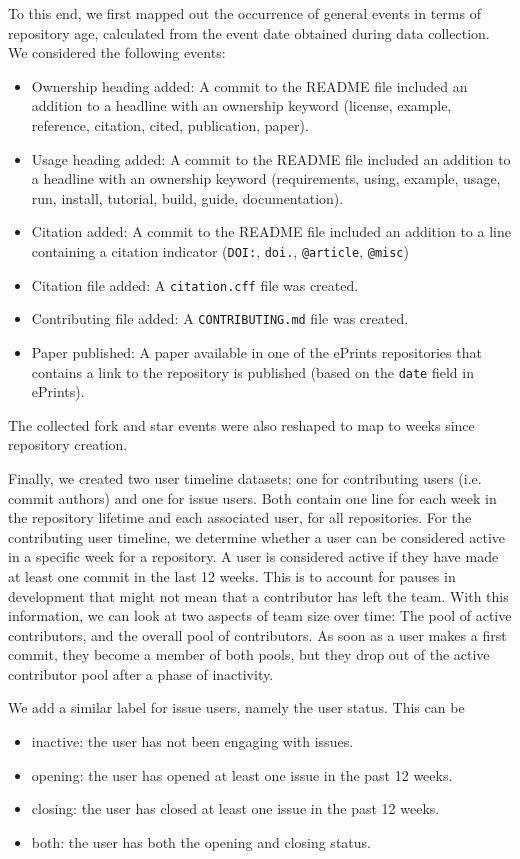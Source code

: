 \documentclass[10pt,a4paper]{scrartcl}
\begin{document}
To this end, we first mapped out the occurrence of general events in terms of repository age, calculated from the event date obtained during data collection.
We considered the following events:
\begin{itemize}
    \item Ownership heading added: A commit to the README file included an addition to a headline with an ownership keyword (license, example, reference, citation, cited, publication, paper).
    \item Usage heading added: A commit to the README file included an addition to a headline with an ownership keyword (requirements, using, example, usage, run, install, tutorial, build, guide, documentation).
    \item Citation added: A commit to the README file included an addition to a line containing a citation indicator (\verb|DOI:|, \verb|doi.|, \verb|@article|, \verb|@misc|)
    \item Citation file added: A \verb|citation.cff| file was created.
    \item Contributing file added: A \verb|CONTRIBUTING.md| file was created.
    \item Paper published: A paper available in one of the ePrints repositories that contains a link to the repository is published (based on the \verb|date| field in ePrints).
\end{itemize}

The collected fork and star events were also reshaped to map to weeks since repository creation.

Finally, we created two user timeline datasets: one for contributing users (i.e. commit authors) and one for issue users.
Both contain one line for each week in the repository lifetime and each associated user, for all repositories.
For the contributing user timeline, we determine whether a user can be considered active in a specific week for a repository.
A user is considered active if they have made at least one commit in the last 12 weeks.
This is to account for pauses in development that might not mean that a contributor has left the team.
With this information, we can look at two aspects of team size over time:
The pool of active contributors, and the overall pool of contributors. 
As soon as a user makes a first commit, they become a member of both pools,
but they drop out of the active contributor pool after a phase of inactivity.

We add a similar label for issue users, namely the user status. This can be
\begin{itemize}
    \item inactive: the user has not been engaging with issues.
    \item opening: the user has opened at least one issue in the past 12 weeks.
    \item closing: the user has closed at least one issue in the past 12 weeks.
    \item both: the user has both the opening and closing status.
\end{itemize}
\end{document}
